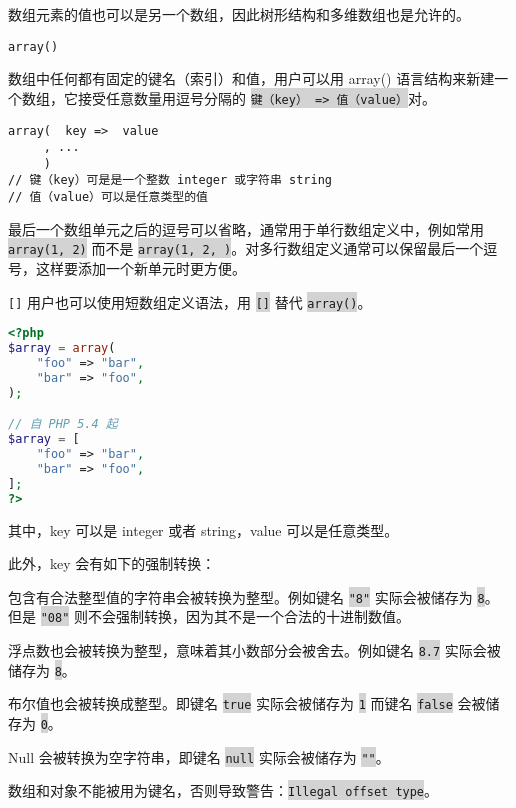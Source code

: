数组元素的值也可以是另一个数组，因此树形结构和多维数组也是允许的。


\begin{compactitem}
\item \texttt{array()}

数组中任何都有固定的键名（索引）和值，用户可以用 array() 语言结构来新建一个数组，它接受任意数量用逗号分隔的 \colorbox{lightgray}{\texttt{键（key） => 值（value）}}对。

\begin{verbatim}
array(  key =>  value
     , ...
     )
// 键（key）可是是一个整数 integer 或字符串 string
// 值（value）可以是任意类型的值
\end{verbatim}

最后一个数组单元之后的逗号可以省略，通常用于单行数组定义中，例如常用 \colorbox{lightgray}{\texttt{array(1, 2)}} 而不是 \colorbox{lightgray}{\texttt{array(1, 2, )}}。对多行数组定义通常可以保留最后一个逗号，这样要添加一个新单元时更方便。

\item \texttt{[]}
用户也可以使用短数组定义语法，用 \colorbox{lightgray}{\texttt{[]}} 替代 \colorbox{lightgray}{\texttt{array()}}。

\begin{lstlisting}[language=PHP]
<?php
$array = array(
    "foo" => "bar",
    "bar" => "foo",
);

// 自 PHP 5.4 起
$array = [
    "foo" => "bar",
    "bar" => "foo",
];
?>
\end{lstlisting}

\end{compactitem}


其中，key 可以是 integer 或者 string，value 可以是任意类型。

此外，key 会有如下的强制转换：

\begin{compactitem}
\item 包含有合法整型值的字符串会被转换为整型。例如键名 \colorbox{lightgray}{\texttt{"8"}} 实际会被储存为 \colorbox{lightgray}{\texttt{8}}。但是 \colorbox{lightgray}{\texttt{"08"}} 则不会强制转换，因为其不是一个合法的十进制数值。
\item 浮点数也会被转换为整型，意味着其小数部分会被舍去。例如键名 \colorbox{lightgray}{\texttt{8.7}} 实际会被储存为 \colorbox{lightgray}{\texttt{8}}。
\item 布尔值也会被转换成整型。即键名 \colorbox{lightgray}{\texttt{true}} 实际会被储存为 \colorbox{lightgray}{\texttt{1}} 而键名 \colorbox{lightgray}{\texttt{false}} 会被储存为 \colorbox{lightgray}{\texttt{0}}。
\item Null 会被转换为空字符串，即键名 \colorbox{lightgray}{\texttt{null}} 实际会被储存为 \colorbox{lightgray}{\texttt{""}}。
\item 数组和对象不能被用为键名，否则导致警告：\colorbox{lightgray}{\texttt{Illegal offset type}}。
\end{compactitem}

